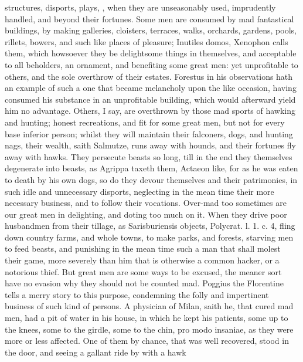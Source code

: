 {structures, disports, plays, \etc{}, when they are unseasonably used,
imprudently handled, and beyond their fortunes. Some men are consumed
by mad fantastical buildings, by making galleries, cloisters, terraces,
walks, orchards, gardens, pools, rillets, bowers, and such like places
of pleasure; Inutiles domos, Xenophon calls them, which howsoever
they be delightsome things in themselves, and acceptable to all
beholders, an ornament, and benefiting some great men: yet unprofitable
to others, and the sole overthrow of their estates. Forestus in his
observations hath an example of such a one that became melancholy upon
the like occasion, having consumed his substance in an unprofitable
building, which would afterward yield him no advantage. Others, I say,
are  overthrown by those mad sports of hawking and hunting;
honest recreations, and fit for some great men, but not for every base
inferior person; whilst they will maintain their falconers, dogs, and
hunting nags, their wealth, saith Salmutze, runs away with
hounds, and their fortunes fly away with hawks. They persecute beasts
so long, till in the end they themselves degenerate into beasts, as
Agrippa taxeth them, Actaeon like, for as he was eaten to
death by his own dogs, so do they devour themselves and their
patrimonies, in such idle and unnecessary disports, neglecting in the
mean time their more necessary business, and to follow their vocations.
Over-mad too sometimes are our great men in delighting, and doting too
much on it. When they drive poor husbandmen from their tillage,
as Sarisburiensis objects, Polycrat. l. 1. c. 4, fling down
country farms, and whole towns, to make parks, and forests, starving
men to feed beasts, and punishing in the mean time such a man
that shall molest their game, more severely than him that is otherwise
a common hacker, or a notorious thief. But great men are some ways to
be excused, the meaner sort have no evasion why they should not be
counted mad. Poggius the Florentine tells a merry story to this
purpose, condemning the folly and impertinent business of such kind of
persons. A physician of Milan, saith he, that cured mad men, had a pit
of water in his house, in which he kept his patients, some up to the
knees, some to the girdle, some to the chin, pro modo insaniae, as they
were more or less affected. One of them by chance, that was well
recovered, stood in the door, and seeing a gallant ride by with a hawk
}
